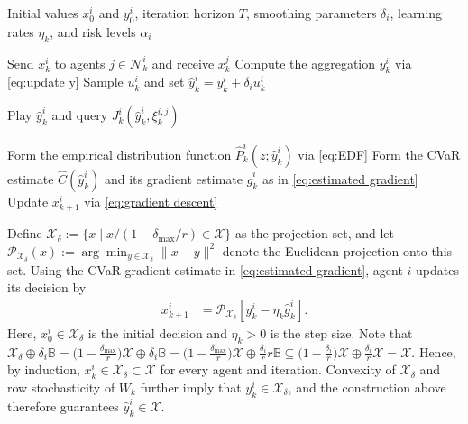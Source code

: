 \documentclass[twocolumn]{autart}    %
\newcommand{\1}{\mathbf{1}}
\begin{document}
\begin{algorithm}[t]
\caption{Zeroth-order distributed risk-averse learning}
\label{alg:zeroth-order}
\begin{algorithmic}[1]
    \Require Initial values $x_0^i$ and $y_0^i$, iteration horizon $T$,
    smoothing parameters $\delta_i$, learning rates $\eta_k$, and risk
    levels $\alpha_i$

            \State Send $x_k^i$ to agents $j\in\mathcal{N}_k^i$ and
            receive $x_k^j$
            \State Compute the aggregation $y_k^i$ via \eqref{eq:update y}
            \State Sample $u_k^i$ and set
            $\hat{y}_k^i = y_k^i + \delta_i u_k^i$

                \State Play $\hat{y}_k^i$ and query
                $J_k^i(\hat{y}_k^i,\xi_k^{i,j})$
            \EndFor

            \State Form the empirical distribution function
            $\hat{P}_k^i(z;\hat{y}_k^i)$ via \eqref{eq:EDF}
            \State Form the CVaR estimate
            $\widehat{C}(\hat{y}_k^i)$ and its gradient estimate
            $\hat{g}_k^i$ as in \eqref{eq:estimated gradient}
            \State Update $x_{k+1}^i$ via
            \eqref{eq:gradient descent}
        \EndFor
    \EndFor
\end{algorithmic}
\end{algorithm}
Define $\mathcal X_\delta:=\{x\mid x/(1-\delta_{\max}/r)\in\mathcal X\}$ as the projection set, and let $\mathcal P_{\mathcal X_\delta}(x):=\arg\min_{y\in\mathcal X_\delta}\|x-y\|^2$ denote the Euclidean projection onto this set.
Using the CVaR gradient estimate in \eqref{eq:estimated gradient}, agent $i$ updates its decision by
\begin{align}
x_{k+1}^i &= \mathcal{P}_{\mathcal{X}_\delta} [y_{k}^i - \eta_k \hat{g}_k^i]. \label{eq:gradient descent}
\end{align}   
Here, $x_0^i\in\mathcal X_\delta$ is the initial decision and $\eta_k>0$ is the step size.
Note that 
$  \mathcal{X}_\delta  \oplus \delta_i  \mathbb{B} =  \big(1-\frac{\delta_{\max}}{r}\big)\mathcal{X} \oplus \delta_i   \mathbb{B} = \big(1-\frac{\delta_{\max}}{r}\big)\mathcal{X} \oplus \frac{\delta_i}{r} r   \mathbb{B}  \subseteq \big(1-\frac{\delta_i}{r}\big)\mathcal{X} \oplus \frac{\delta_i}{r} \mathcal{X} = \mathcal{X}.  $  
Hence, by induction, $x_k^i\in\mathcal X_\delta\subset\mathcal X$ for every agent and iteration. 
Convexity of $\mathcal X_\delta$ and row stochasticity of $W_k$ further imply that $y_k^i\in\mathcal X_\delta$, 
and the construction above therefore guarantees $\hat y_k^i\in\mathcal X$.
\end{document}
